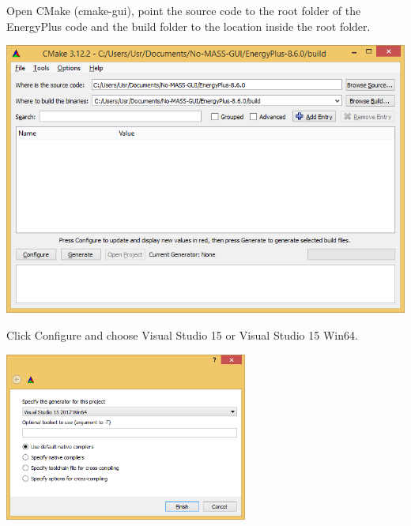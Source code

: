\begin{DoxyEnumerate}
\item Open {\ttfamily C\+Make (cmake-\/gui)}, point the {\ttfamily source code} to the root folder of the Energy\+Plus code and the {\ttfamily build} folder to the location inside the root folder. 
\begin{DoxyImage}
\includegraphics[width=15cm]{win_cmake_step1.png}
\end{DoxyImage}
  
\item Click {\ttfamily Configure} and choose {\ttfamily Visual Studio 15} or {\ttfamily Visual Studio 15 Win64}. 
\begin{DoxyImage}
\includegraphics[width=8cm]{win_cmake_step2.png}
\end{DoxyImage}
  

\end{DoxyEnumerate}
